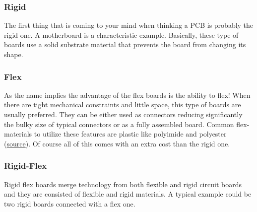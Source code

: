 \documentclass[final]{cubedoc}
\begin{document}
	\subsubsection{Rigid}
	The first thing that is coming to your mind when thinking a PCB is probably the rigid one. A motherboard is a characteristic example. Basically, these type of boards  use a solid substrate material that prevents the board from changing its shape. 
	
	\subsubsection{Flex}
	As the name implies the advantage of the flex boards is the ability to flex! When there are tight mechanical constraints and little space, this type of boards are usually preferred. They can be either used as connectors reducing significantly the bulky size of typical connectors or as a fully assembled board. Common flex-materials to utilize these features are plastic like polyimide and polyester (\href{https://www.altium.com/rigid-flex-circuits-resources/flex-circuit-materials}{source}). Of course all of this comes with an extra cost than the rigid one.
	
	\subsubsection{Rigid-Flex}
	Rigid flex boards merge technology from both flexible and rigid circuit boards and they are consisted of flexible and rigid materials. A typical example could be two rigid boards connected with a flex one.
	
	
\end{document}
